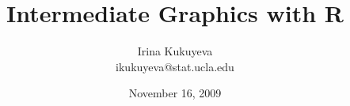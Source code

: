 \title{Intermediate Graphics with \ttfamily R \normalfont}
\author{Irina Kukuyeva \\ \ttfamily ikukuyeva@stat.ucla.edu \normalfont}
\date{November 16, 2009}



\frame{ \titlepage }
